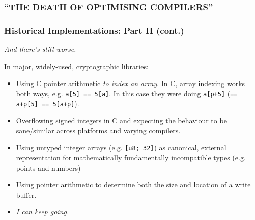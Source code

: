 \documentclass[xetex,aspectratio=169]{beamer}
\begin{document}
 {
   \begin{frame}[plain]
     \frametitle{``THE DEATH OF OPTIMISING COMPILERS''}
   \end{frame}
 }

  \begin{frame}
    \frametitle{Historical Implementations: Part II (cont.)}

    \emph{And there's still worse.}

    \pause In major, widely-used, cryptographic libraries:

    \begin{itemize}
      \item<2-> Using C pointer arithmetic \emph{to index an array}.  In C,
        array indexing works both ways, e.g. \texttt{a[5] == 5[a]}. In this case
        they were doing \texttt{a[p+5]} (\texttt{== a+p[5] == 5[a+p]}).
      \item<3-> Overflowing signed integers in C and expecting the behaviour to
        be sane/similar across platforms and varying compilers.
      \item<4-> Using untyped integer arrays (e.g. \texttt{[u8; 32]}) as
        canonical, external representation for mathematically fundamentally
        incompatible types (e.g. points and numbers)
      \item<5-> Using pointer arithmetic to determine both the size and location
        of a write buffer.
      \item<6-> \emph{I can keep going.}
    \end{itemize}
  \end{frame}
\end{document}
